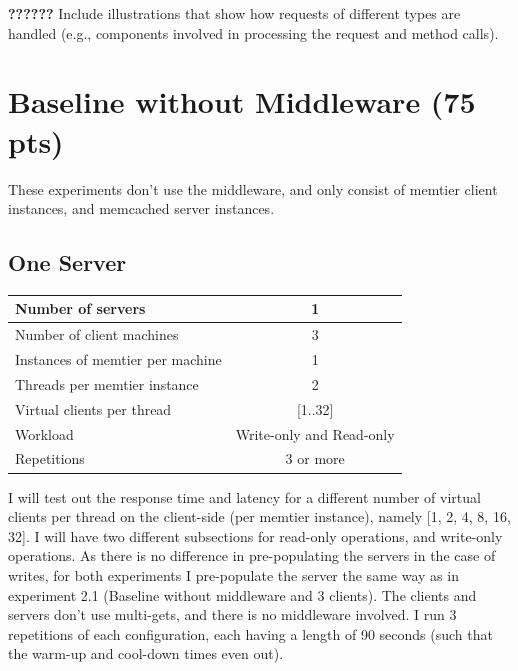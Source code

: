 \documentclass[11pt,a4paper]{article}
\begin{document}
\textbf{??????}
Include illustrations that show how requests of different types are handled (e.g., components involved in processing the request and method calls). 

\section{Baseline without Middleware (75 pts)}
These experiments don't use the middleware, and only consist of memtier client instances, and memcached server instances.

\subsection{One Server}

\begin{center}
	\scriptsize{
		\begin{tabular}{|l|c|}
			\hline Number of servers                & 1                        \\ 
			\hline Number of client machines        & 3                        \\ 
			\hline Instances of memtier per machine & 1                        \\ 
			\hline Threads per memtier instance     & 2                        \\
			\hline Virtual clients per thread       & [1..32]                  \\ 
			\hline Workload                         & Write-only and Read-only \\
			\hline Repetitions                      & 3 or more                \\ 
			\hline 
		\end{tabular}
	} 
\end{center}

I will test out the response time and latency for a different number of virtual clients per thread on the client-side (per memtier instance), namely [1, 2, 4, 8, 16, 32].
I will have two different subsections for read-only operations, and write-only operations.
As there is no difference in pre-populating the servers in the case of writes, for both experiments I pre-populate the server the same way as in experiment 2.1 (Baseline without middleware and 3 clients).
The clients and servers don't use multi-gets, and there is no middleware involved.
I run 3 repetitions of each configuration, each having a length of 90 seconds (such that the warm-up and cool-down times even out).
\end{document}
